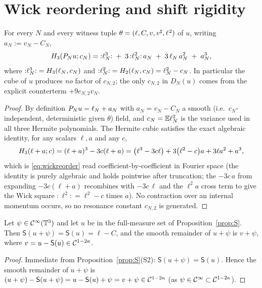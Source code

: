 \section*{Wick reordering and shift rigidity}

\begin{qonelemma}\label{lem:reorder}
For every $N$ and every witness tuple $\theta=(\ell,C,v,v^\sharp,\ell^{\hspace{0.5pt}2})$ of $u$,
writing $a_N:=v_N-C_N$,
\begin{equation}\label{eq:wickreorder}
H_3(P_N u;c_N)
={:}\ell_N^3{:}\;+\;3\,{:}\ell_N^2{:}\,a_N\;+\;3\,\ell_N\,a_N^2\;+\;a_N^3,
\end{equation}
where ${:}\ell_N^3{:}=H_3(\ell_N,c_N)$ and ${:}\ell_N^2{:}=H_2(\ell_N,c_N)=\ell_N^2-c_N$.
In particular the cube of $u$ produces \emph{no} factor of $c_{N,2}$; the only
$c_{N,2}$ in $D_N(u)$ comes from the explicit counterterm $+9c_{N,2}v_N$.
\end{qonelemma}

\begin{proof}
By definition $P_N u=\ell_N+a_N$ with $a_N=v_N-C_N$ a smooth (i.e.\
$c_N$-independent, deterministic given $\theta$) field, and $c_N=\mathbb{E}\ell_N^2$ is
the variance used in all three Hermite polynomials. The Hermite cubic satisfies
the exact algebraic identity, for any scalars $\ell,a$ and any $c$,
\[
H_3(\ell+a;c)=(\ell+a)^3-3c(\ell+a)
=\bigl(\ell^3-3c\ell\bigr)+3\bigl(\ell^2-c\bigr)a+3\ell a^2+a^3 ,
\]
which is \eqref{eq:wickreorder} read coefficient-by-coefficient in Fourier space
(the identity is purely algebraic and holds pointwise after truncation; the
$-3c\,a$ from expanding $-3c(\ell+a)$ recombines with $-3c\,\ell$ and the $\ell^2 a$
cross term to give the Wick square ${:}\ell^2{:}=\ell^2-c$ times $a$). No
contraction over an internal momentum occurs, so no resonance constant $c_{N,2}$
is generated.
\end{proof}

\begin{qonelemma}\label{lem:rigid}
Let $\psi\in\mathcal{C}^\infty(\mathbb{T}^3)$ and let $u$ be in the full-measure set of
Proposition~\ref{prop:S}. Then $\mathsf S(u+\psi)=\mathsf S(u)=\ell-C$, and the
smooth remainder of $u+\psi$ is $v+\psi$, where $v=u-\mathsf S(u)\in\mathcal{C}^{1-2\kappa}$.
\end{qonelemma}

\begin{proof}
Immediate from Proposition~\ref{prop:S}(S2): $\mathsf S(u+\psi)=\mathsf S(u)$.
Hence the smooth remainder of $u+\psi$ is
$(u+\psi)-\mathsf S(u+\psi)=u-\mathsf S(u)+\psi=v+\psi\in\mathcal{C}^{1-2\kappa}$
(as $\psi\in\mathcal{C}^\infty\subset\mathcal{C}^{1-2\kappa}$).
\end{proof}

